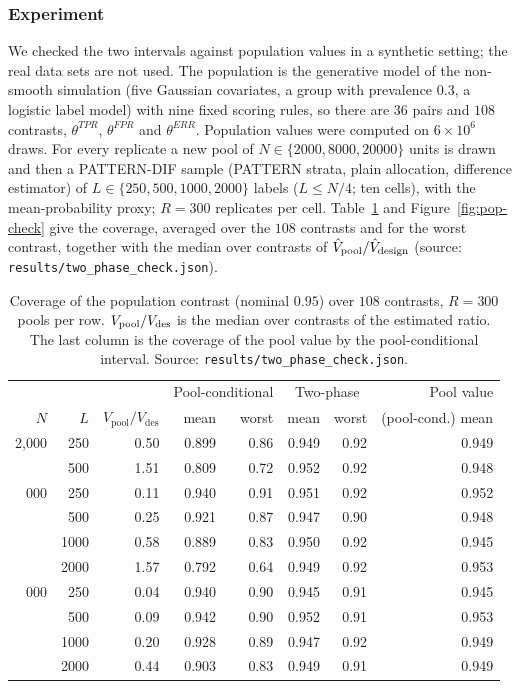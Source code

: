 \documentclass[pdflatex,sn-mathphys-num,iicol]{sn-jnl}
\theoremstyle{thmstyleone}
\theoremstyle{thmstyletwo}
\theoremstyle{thmstylethree}
\begin{document}
\subsubsection*{Experiment}
We checked the two intervals against population values in a synthetic setting; the real data sets are not used. The population is the generative model of the non-smooth simulation (five Gaussian covariates, a group with prevalence $0.3$, a logistic label model) with nine fixed scoring rules, so there are $36$ pairs and $108$ contrasts, $\theta^{TPR}$, $\theta^{FPR}$ and $\theta^{ERR}$. Population values were computed on $6\times10^{6}$ draws. For every replicate a new pool of $N\in\{2000,8000,20000\}$ units is drawn and then a PATTERN-DIF sample (PATTERN strata, plain allocation, difference estimator) of $L\in\{250,500,1000,2000\}$ labels ($L\le N/4$; ten cells), with the mean-probability proxy; $R=300$ replicates per cell. Table~\ref{tab:pop-check} and Figure~\ref{fig:pop-check} give the coverage, averaged over the $108$ contrasts and for the worst contrast, together with the median over contrasts of $\hat V_{\rm pool}/\hat V_{\rm design}$ (source: \texttt{results/two\_phase\_check.json}).

\begin{table}[t]
\centering\footnotesize
\caption{Coverage of the population contrast (nominal $0.95$) over $108$ contrasts, $R=300$ pools per row. $V_{\rm pool}/V_{\rm des}$ is the median over contrasts of the estimated ratio. The last column is the coverage of the pool value by the pool-conditional interval. Source: \texttt{results/two\_phase\_check.json}.}\label{tab:pop-check}
\begin{tabular}{rr r rr rr r}\toprule
 & & & \multicolumn{2}{c}{Pool-conditional} & \multicolumn{2}{c}{Two-phase} & Pool value \\
$N$ & $L$ & $V_{\mathrm{pool}}/V_{\mathrm{des}}$ & mean & worst & mean & worst & (pool-cond.) mean \\\midrule
2{,}000 & 250 & 0.50 & 0.899 & 0.86 & 0.949 & 0.92 & 0.949 \\
 & 500 & 1.51 & 0.809 & 0.72 & 0.952 & 0.92 & 0.948 \\
\addlinespace
8{,}000 & 250 & 0.11 & 0.940 & 0.91 & 0.951 & 0.92 & 0.952 \\
 & 500 & 0.25 & 0.921 & 0.87 & 0.947 & 0.90 & 0.948 \\
 & 1000 & 0.58 & 0.889 & 0.83 & 0.950 & 0.92 & 0.945 \\
 & 2000 & 1.57 & 0.792 & 0.64 & 0.949 & 0.92 & 0.953 \\
\addlinespace
20{,}000 & 250 & 0.04 & 0.940 & 0.90 & 0.945 & 0.91 & 0.945 \\
 & 500 & 0.09 & 0.942 & 0.90 & 0.952 & 0.91 & 0.953 \\
 & 1000 & 0.20 & 0.928 & 0.89 & 0.947 & 0.92 & 0.949 \\
 & 2000 & 0.44 & 0.903 & 0.83 & 0.949 & 0.91 & 0.949 \\
\bottomrule\end{tabular}

\end{table}
\end{document}
